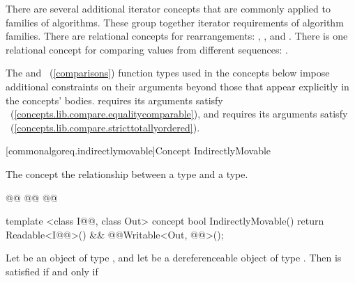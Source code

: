 \begin{addedblock}
\pnum
There are several additional iterator concepts that are commonly applied to families of algorithms.
These group together iterator requirements of algorithm families.  There are  relational concepts
for rearrangements: , , and .
There is one relational concept for comparing values from different sequences: .

{\color{newclr}
\pnum
\enternote The  and ~(\ref{comparisons}) function types used in the
concepts below impose additional constraints on their arguments beyond those that appear explicitly in the
concepts' bodies.  requires its arguments satisfy ~(\ref{concepts.lib.compare.equalitycomparable}),
and  requires its arguments satisfy ~(\ref{concepts.lib.compare.stricttotallyordered}).\exitnote
}

[commonalgoreq.indirectlymovable]{Concept IndirectlyMovable}

\pnum
The  concept  the relationship between a 
type and a  type.

%
\begin{codeblock}
  @@
  @@
    @@

  template <class I@@, class Out>
  concept bool IndirectlyMovable() {
    return Readable<I@@>() &&
      @@Writable<Out, @@>();
  }
\end{codeblock}


{\color{oldclr} %
\pnum
Let  be an object of type , and let  be a
dereferenceable object of type . Then
 is satisfied if and only if

}
\end{addedblock}
